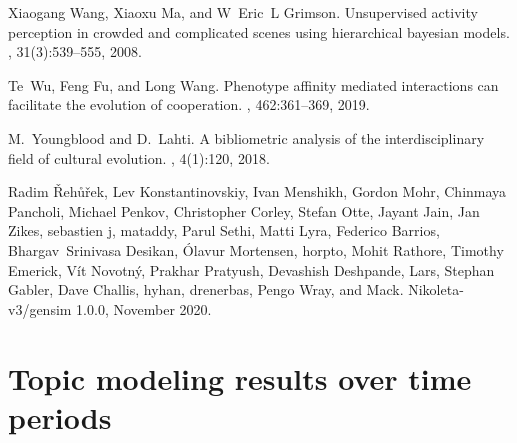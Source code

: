 \documentclass{article}
\theoremstyle{definition}
\begin{document}
\begin{thebibliography}{10}
    Xiaogang Wang, Xiaoxu Ma, and W~Eric~L Grimson.
    \newblock Unsupervised activity perception in crowded and complicated scenes
      using hierarchical bayesian models.
    ,
      31(3):539--555, 2008.
    
    Te~Wu, Feng Fu, and Long Wang.
    \newblock Phenotype affinity mediated interactions can facilitate the evolution
      of cooperation.
    , 462:361--369, 2019.
    
    M.~Youngblood and D.~Lahti.
    \newblock A bibliometric analysis of the interdisciplinary field of cultural
      evolution.
    , 4(1):120, 2018.
    
    Radim Řehůřek, Lev Konstantinovskiy, Ivan Menshikh, Gordon Mohr, Chinmaya
      Pancholi, Michael Penkov, Christopher Corley, Stefan Otte, Jayant Jain, Jan
      Zikes, sebastien j, mataddy, Parul Sethi, Matti Lyra, Federico Barrios,
      Bhargav~Srinivasa Desikan, Ólavur Mortensen, horpto, Mohit Rathore, Timothy
      Emerick, Vít Novotný, Prakhar Pratyush, Devashish Deshpande, Lars, Stephan
      Gabler, Dave Challis, hyhan, drenerbas, Pengo Wray, and Mack.
    \newblock Nikoleta-v3/gensim 1.0.0, November 2020.
    
\end{thebibliography}


\appendix

\section{Topic modeling results over time periods}\label{appendix:topics_per_year}
\end{document}
